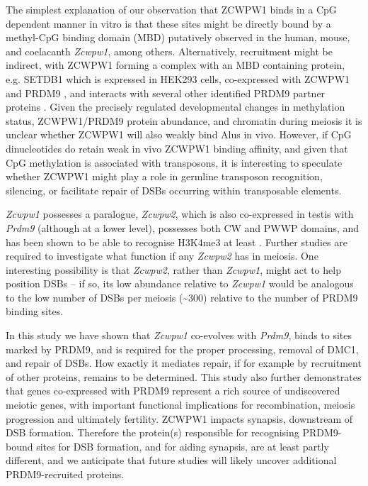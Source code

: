 The simplest explanation of our observation that ZCWPW1 binds in a CpG dependent manner in vitro is that these sites might be directly bound by a methyl-CpG binding domain (MBD) putatively observed in the human, mouse, and coelacanth \textit{Zcwpw1}, among others.
Alternatively, recruitment might be indirect, with ZCWPW1 forming a complex with an MBD containing protein, e.g. SETDB1 which is expressed in HEK293 cells, co-expressed with ZCWPW1 and PRDM9 \parencite{Jung2019Unified, Schultz2002SETDB1}, and interacts with several other identified PRDM9 partner proteins \parencite{Mulligan2008CDYL, Parvanov2017PRDM9}.
Given the precisely regulated developmental changes in methylation status, ZCWPW1/PRDM9 protein abundance, and chromatin during meiosis \parencite{Gaysinskaya2018Transient, SeisenbergerStefanie2013Reprogramming} it is unclear whether ZCWPW1 will also weakly bind Alus in vivo.
However, if CpG dinucleotides do retain weak in vivo ZCWPW1 binding affinity, and given that CpG methylation is associated with transposons, it is interesting to speculate whether ZCWPW1 might play a role in germline transposon recognition, silencing, or facilitate repair of DSBs occurring within transposable elements.

\textit{Zcwpw1} possesses a paralogue, \textit{Zcwpw2}, which is also co-expressed in testis with \textit{Prdm9} (although at a lower level), possesses both CW and PWWP domains, and has been shown to be able to recognise H3K4me3 at least \parencite{Liu2016Familywide}.
Further studies are required to investigate what function if any \textit{Zcwpw2} has in meiosis.
One interesting possibility is that \textit{Zcwpw2}, rather than \textit{Zcwpw1}, might act to help position DSBs – if so, its low abundance relative to \textit{Zcwpw1} would be analogous to the low number of DSBs per meiosis (\textasciitilde300) relative to the number of PRDM9 binding sites.

In this study we have shown that \textit{Zcwpw1} co-evolves with \textit{Prdm9}, binds to sites marked by PRDM9, and is required for the proper processing, removal of DMC1, and repair of DSBs.
How exactly it mediates repair, if for example by recruitment of other proteins, remains to be determined.
This study also further demonstrates that genes co-expressed with PRDM9 represent a rich source of undiscovered meiotic genes, with important functional implications for recombination, meiosis progression and ultimately fertility.
ZCWPW1 impacts synapsis, downstream of DSB formation.
Therefore the protein(s) responsible for recognising PRDM9-bound sites for DSB formation, and for aiding synapsis, are at least partly different, and we anticipate that future studies will likely uncover additional PRDM9-recruited proteins.

